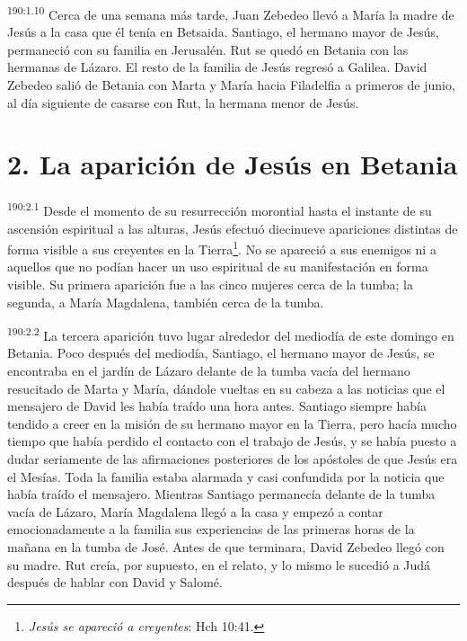 \par
\textsuperscript{190:1.10} Cerca de una semana más tarde, Juan Zebedeo llevó a María la madre de Jesús a la casa que él tenía en Betsaida. Santiago, el hermano mayor de Jesús, permaneció con su familia en Jerusalén. Rut se quedó en Betania con las hermanas de Lázaro. El resto de la familia de Jesús regresó a Galilea. David Zebedeo salió de Betania con Marta y María hacia Filadelfia a primeros de junio, al día siguiente de casarse con Rut, la hermana menor de Jesús.

\section*{2. La aparición de Jesús en Betania}
\par
\textsuperscript{190:2.1} Desde el momento de su resurrección morontial hasta el instante de su ascensión espiritual a las alturas, Jesús efectuó diecinueve apariciones distintas de forma visible a sus creyentes en la Tierra\footnote{\textit{Jesús se apareció a creyentes}: Hch 10:41.}. No se apareció a sus enemigos ni a aquellos que no podían hacer un uso espiritual de su manifestación en forma visible. Su primera aparición fue a las cinco mujeres cerca de la tumba; la segunda, a María Magdalena, también cerca de la tumba.

\par
\textsuperscript{190:2.2} La tercera aparición tuvo lugar alrededor del mediodía de este domingo en Betania. Poco después del mediodía, Santiago, el hermano mayor de Jesús, se encontraba en el jardín de Lázaro delante de la tumba vacía del hermano resucitado de Marta y María, dándole vueltas en su cabeza a las noticias que el mensajero de David les había traído una hora antes. Santiago siempre había tendido a creer en la misión de su hermano mayor en la Tierra, pero hacía mucho tiempo que había perdido el contacto con el trabajo de Jesús, y se había puesto a dudar seriamente de las afirmaciones posteriores de los apóstoles de que Jesús era el Mesías. Toda la familia estaba alarmada y casi confundida por la noticia que había traído el mensajero. Mientras Santiago permanecía delante de la tumba vacía de Lázaro, María Magdalena llegó a la casa y empezó a contar emocionadamente a la familia sus experiencias de las primeras horas de la mañana en la tumba de José. Antes de que terminara, David Zebedeo llegó con su madre. Rut creía, por supuesto, en el relato, y lo mismo le sucedió a Judá después de hablar con David y Salomé.

